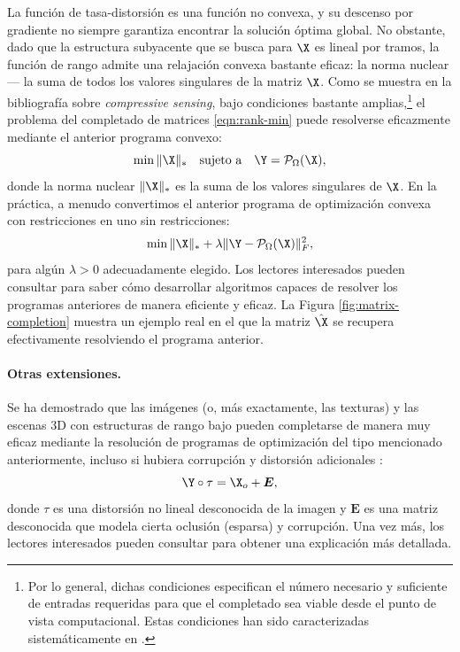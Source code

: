\documentclass[../../book-main_es.tex]{subfiles}
\begin{document}
La función de tasa-distorsión es una función no convexa, y su
descenso por gradiente no siempre garantiza encontrar la solución
óptima global. No obstante, dado que la estructura subyacente que se busca
para $\X$ es lineal por tramos, la función de rango admite una
relajación convexa bastante eficaz: la
norma nuclear --- la suma de todos los valores singulares de la matriz $\X$. Como
se muestra en la bibliografía sobre \textit{compressive sensing}, bajo condiciones bastante
amplias,\footnote{Por lo general, dichas condiciones especifican el número
    necesario y suficiente de entradas requeridas para que el
    completado sea viable desde el punto de vista computacional. Estas condiciones han sido
caracterizadas sistemáticamente en \cite{Wright-Ma-2022}.} el problema del
completado de matrices \eqref{eqn:rank-min}
puede resolverse eficazmente mediante el anterior programa convexo:
\begin{equation}
    \min \|\X\|_* \quad \mbox{sujeto a}
    \quad
    \Y = \mathcal{P}_{\Omega}(\X),
    \label{eqn:nuclear-min}
\end{equation}
donde la norma nuclear $\|\X\|_*$ es la suma de los valores singulares de
$\X$. En la práctica, a menudo convertimos el anterior programa de optimización convexa con restricciones 
en uno sin restricciones:
\begin{equation}
    \min \|\X\|_*  + \lambda \|
    \Y - \mathcal{P}_{\Omega}(\X)\|_F^2,
    \label{eqn:nuclear-min-lagrangian}
\end{equation}
para algún $\lambda > 0$ adecuadamente elegido. Los lectores interesados pueden consultar
\cite{Wright-Ma-2022} para saber cómo desarrollar algoritmos capaces de resolver
los programas anteriores de manera eficiente y eficaz.
La Figura \ref{fig:matrix-completion} muestra un ejemplo real en el que la
matriz $\hat \X$ se recupera efectivamente resolviendo el programa anterior.

\paragraph{Otras extensiones.}
Se ha demostrado que las imágenes (o, más exactamente, las texturas) y las escenas 3D
con estructuras de rango bajo pueden completarse de manera muy eficaz mediante
la resolución de programas de optimización del tipo mencionado anteriormente, incluso si hubiera
corrupción y distorsión adicionales
\cite{Zhang2010TILTTI,Liang-ECCV2012,Yi_2023_ICCV}:
\begin{equation}
    \Y \circ \tau = \X_o + \boldsymbol{E},
\end{equation}
donde $\tau$ es una distorsión no lineal desconocida de la imagen y
$\boldsymbol{E}$ es una matriz desconocida que modela cierta oclusión
(esparsa) y corrupción. Una vez más, los lectores interesados pueden consultar
\cite{Wright-Ma-2022} para obtener una explicación más detallada.
\end{document}
